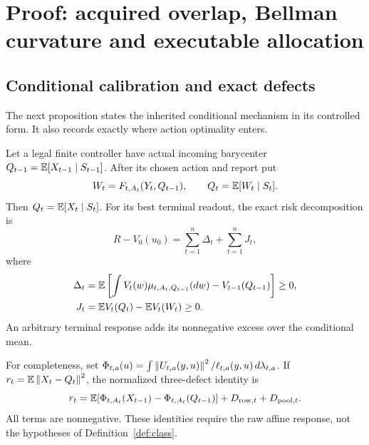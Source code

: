 \section{Proof: acquired overlap, Bellman curvature and executable allocation}\label{sec:proof}
\subsection{Conditional calibration and exact defects}
The next proposition states the inherited conditional mechanism in its controlled form. It also records exactly where action optimality enters.
\begin{proposition}\label{prop:identity}
Let a legal finite controller have actual incoming barycenter $Q_{t-1}=\mathbb E[X_{t-1}\mid S_{t-1}]$. After its chosen action and report put
\[
 W_t=F_{t,A_t}(Y_t,Q_{t-1}),\qquad Q_t=\mathbb E[W_t\mid S_t].
\]
Then $Q_t=\mathbb E[X_t\mid S_t]$. For its best terminal readout, the exact risk decomposition is
\begin{equation}\label{eq:bellman-defect}
 R-V_0(u_0)=\sum_{t=1}^n\Delta_t+\sum_{t=1}^n J_t,
\end{equation}
where
\begin{align*}
 \Delta_t&=\mathbb E\left[\int V_t(w)\mu_{t,A_t,Q_{t-1}}(dw)
                         -V_{t-1}(Q_{t-1})\right]\ge0,\\
 J_t&=\mathbb E V_t(Q_t)-\mathbb E V_t(W_t)\ge0.
\end{align*}
An arbitrary terminal response adds its nonnegative excess over the conditional mean.

For completeness, set
$\Phi_{t,a}(u)=\int\left\lVert U_{t,a}(y,u)\right\rVert^2/\ell_{t,a}(y,u)\,d\lambda_{t,a}$.
If $r_t=\mathbb E\left\lVert X_t-Q_t\right\rVert^2$, the normalized three-defect identity is
\begin{equation}\label{eq:three-defect}
 r_t=\mathbb E[\Phi_{t,A_t}(X_{t-1})-\Phi_{t,A_t}(Q_{t-1})]
                 +D_{{\rm row},t}+D_{{\rm pool},t}.
\end{equation}
All terms are nonnegative. These identities require the raw affine response, not the hypotheses of Definition~\ref{def:class}.
\end{proposition}
